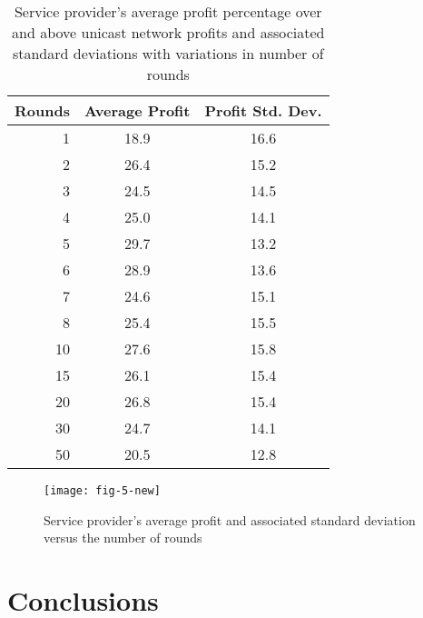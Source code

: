 \documentclass[conference,a4paper]{IEEEtran}
\newcommand{\tablefontsize}{\small}
\begin{document}
\begin{table}[ht]
\centering
\caption{Service provider's average profit percentage over and above unicast network profits and associated standard deviations with variations in number of rounds}
\label{tab:table1}
\begin{tabular}{|r|c|c|}
\hline
\multicolumn{1}{|c|}{\textbf{\tablefontsize Rounds}} & \multicolumn{1}{|c|}{\textbf{\tablefontsize Average Profit}} & \multicolumn{1}{|c|}{\textbf{\tablefontsize Profit Std. Dev.}} \\
\hline
{\tablefontsize 1} & {\tablefontsize 18.9} & {\tablefontsize 16.6} \\
\hline
{\tablefontsize 2} & {\tablefontsize 26.4} & {\tablefontsize 15.2} \\
\hline
{\tablefontsize 3} & {\tablefontsize 24.5} & {\tablefontsize 14.5} \\
\hline
{\tablefontsize 4} & {\tablefontsize 25.0} & {\tablefontsize 14.1} \\
\hline
{\tablefontsize 5} & {\tablefontsize 29.7} & {\tablefontsize 13.2} \\
\hline
{\tablefontsize 6} & {\tablefontsize 28.9} & {\tablefontsize 13.6} \\
\hline
{\tablefontsize 7} & {\tablefontsize 24.6} & {\tablefontsize 15.1} \\
\hline
{\tablefontsize 8} & {\tablefontsize 25.4} & {\tablefontsize 15.5} \\
\hline
{\tablefontsize 10} & {\tablefontsize 27.6} & {\tablefontsize 15.8} \\
\hline
{\tablefontsize 15} & {\tablefontsize 26.1} & {\tablefontsize 15.4} \\
\hline
{\tablefontsize 20} & {\tablefontsize 26.8} & {\tablefontsize 15.4} \\
\hline
{\tablefontsize 30} & {\tablefontsize 24.7} & {\tablefontsize 14.1} \\
\hline
{\tablefontsize 50} & {\tablefontsize 20.5} & {\tablefontsize 12.8} \\
\hline
\end{tabular}
\end{table}


\begin{figure}
  \texttt{[image: fig-5-new]}
  \caption{Service provider's average profit and associated standard deviation versus the number of rounds}
  \label{fig:avg-profit-std-dev-revisit}
\end{figure}

\section{Conclusions}
\label{sec:conclusions}
\end{document}

